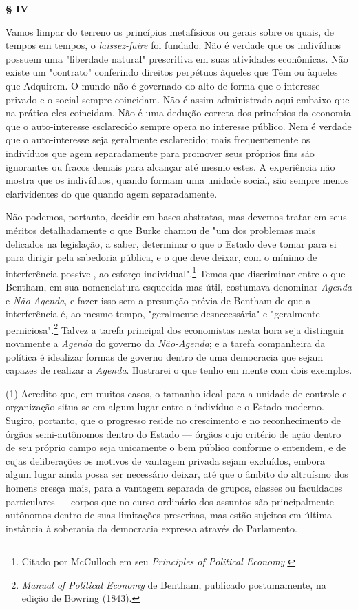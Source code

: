 \documentclass[12pt]{article}
\begin{document}
\begin{center}
\textbf{§ IV}
\end{center}

Vamos limpar do terreno os princípios metafísicos ou gerais sobre os quais, de tempos em tempos, o \textit{laissez-faire} foi fundado. Não é verdade que os indivíduos possuem uma "liberdade natural" prescritiva em suas atividades econômicas. Não existe um "contrato" conferindo direitos perpétuos àqueles que Têm ou àqueles que Adquirem. O mundo não é governado do alto de forma que o interesse privado e o social sempre coincidam. Não é assim administrado aqui embaixo que na prática eles coincidam. Não é uma dedução correta dos princípios da economia que o auto-interesse esclarecido sempre opera no interesse público. Nem é verdade que o auto-interesse seja geralmente esclarecido; mais frequentemente os indivíduos que agem separadamente para promover seus próprios fins são ignorantes ou fracos demais para alcançar até mesmo estes. A experiência não mostra que os indivíduos, quando formam uma unidade social, são sempre menos clarividentes do que quando agem separadamente.

Não podemos, portanto, decidir em bases abstratas, mas devemos tratar em seus méritos detalhadamente o que Burke chamou de "um dos problemas mais delicados na legislação, a saber, determinar o que o Estado deve tomar para si para dirigir pela sabedoria pública, e o que deve deixar, com o mínimo de interferência possível, ao esforço individual".\footnote{Citado por McCulloch em seu \textit{Principles of Political Economy}.} Temos que discriminar entre o que Bentham, em sua nomenclatura esquecida mas útil, costumava denominar \textit{Agenda} e \textit{Não-Agenda}, e fazer isso sem a presunção prévia de Bentham de que a interferência é, ao mesmo tempo, "geralmente desnecessária" e "geralmente perniciosa".\footnote{\textit{Manual of Political Economy} de Bentham, publicado postumamente, na edição de Bowring (1843).} Talvez a tarefa principal dos economistas nesta hora seja distinguir novamente a \textit{Agenda} do governo da \textit{Não-Agenda}; e a tarefa companheira da política é idealizar formas de governo dentro de uma democracia que sejam capazes de realizar a \textit{Agenda}. Ilustrarei o que tenho em mente com dois exemplos.

(1) Acredito que, em muitos casos, o tamanho ideal para a unidade de controle e organização situa-se em algum lugar entre o indivíduo e o Estado moderno. Sugiro, portanto, que o progresso reside no crescimento e no reconhecimento de órgãos semi-autônomos dentro do Estado — órgãos cujo critério de ação dentro de seu próprio campo seja unicamente o bem público conforme o entendem, e de cujas deliberações os motivos de vantagem privada sejam excluídos, embora algum lugar ainda possa ser necessário deixar, até que o âmbito do altruísmo dos homens cresça mais, para a vantagem separada de grupos, classes ou faculdades particulares — corpos que no curso ordinário dos assuntos são principalmente autônomos dentro de suas limitações prescritas, mas estão sujeitos em última instância à soberania da democracia expressa através do Parlamento.
\end{document}
